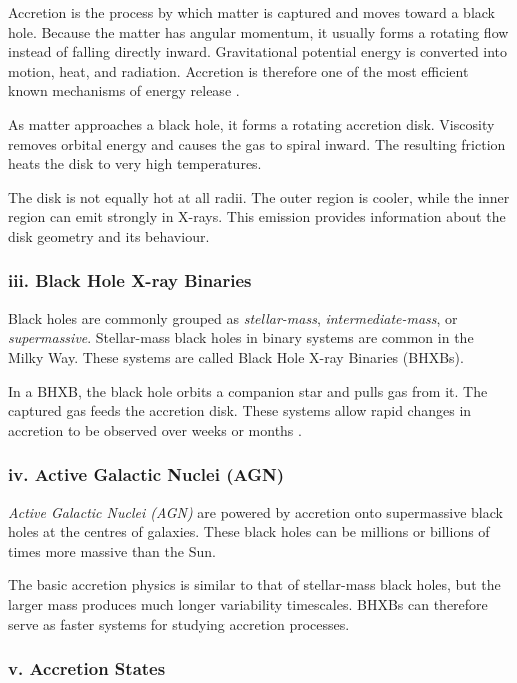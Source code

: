 Accretion is the process by which matter is captured and moves toward a black hole. Because the matter has angular momentum, it usually forms a rotating flow instead of falling directly inward. Gravitational potential energy is converted into motion, heat, and radiation. Accretion is therefore one of the most efficient known mechanisms of energy release \cite{shakura1973, frank2002}.

As matter approaches a black hole, it forms a rotating accretion disk. Viscosity removes orbital energy and causes the gas to spiral inward. The resulting friction heats the disk to very high temperatures.

The disk is not equally hot at all radii. The outer region is cooler, while the inner region can emit strongly in X-rays. This emission provides information about the disk geometry and its behaviour.

\subsubsection*{iii. Black Hole X-ray Binaries}

Black holes are commonly grouped as \textit{stellar-mass}, \textit{intermediate-mass}, or \textit{supermassive}. Stellar-mass black holes in binary systems are common in the Milky Way. These systems are called Black Hole X-ray Binaries (BHXBs).

In a BHXB, the black hole orbits a companion star and pulls gas from it. The captured gas feeds the accretion disk. These systems allow rapid changes in accretion to be observed over weeks or months \cite{remillard2006, done2007}.
\subsubsection*{iv. Active Galactic Nuclei (AGN)}

\textit{Active Galactic Nuclei (AGN)} are powered by accretion onto supermassive black holes at the centres of galaxies. These black holes can be millions or billions of times more massive than the Sun.

The basic accretion physics is similar to that of stellar-mass black holes, but the larger mass produces much longer variability timescales. BHXBs can therefore serve as faster systems for studying accretion processes.

\subsubsection*{v. Accretion States}

